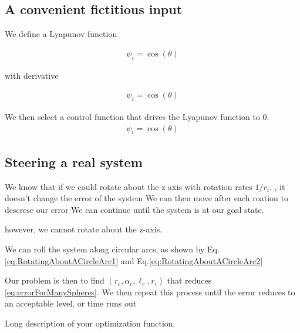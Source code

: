 \documentclass[letter paper, 10pt, conference]{ieeeconf}
\newcommand{\todo}[1]{\vspace{5 mm}\par \noindent \framebox{\begin{minipage}[c]{0.98 \columnwidth} \ttfamily\flushleft \textcolor{red}{#1}\end{minipage}}\vspace{5 mm}\par}
\begin{document}
\subsection{A convenient fictitious input}

We define a Lyapunov function

\begin{align}
\psi_i = \cos( \theta) \label{eq:MultipleSphereLyapunov}
\end{align}

with derivative

\begin{align}
\psi_i = \cos( \theta) \label{eq:MultipleSphereLyapunovDerivative}
\end{align}

We then select a control function that drives the Lyapunov function to 0.
\begin{align}
\psi_i = \cos( \theta) \label{eq:ControlLyapunovFunction}
\end{align}

\subsection{Steering a real system}

We know that if we could rotate about the z axis with rotation rates $1/r_i$.  , it doesn't change the error of the system
We can then move after each roation to descrese our error 
We can continue until the system is at our goal state.
 
 
however, we cannot rotate about the z-axis.

We can roll the system along circular arcs, as shown by Eq. \eqref{eq:RotatingAboutACircleArc1} and Eq.\eqref{eq:RotatingAboutACircleArc2}


Our problem is then to find $(r_c, \alpha_c, \ell_c, r_i)  $ that reduces \eqref{eq:errorForManySpheres}.  We then repeat this process until the error reduces to an acceptable level, or time runs out


\todo{Some plots of this.}


Long description of your optimization function.




\end{document}

